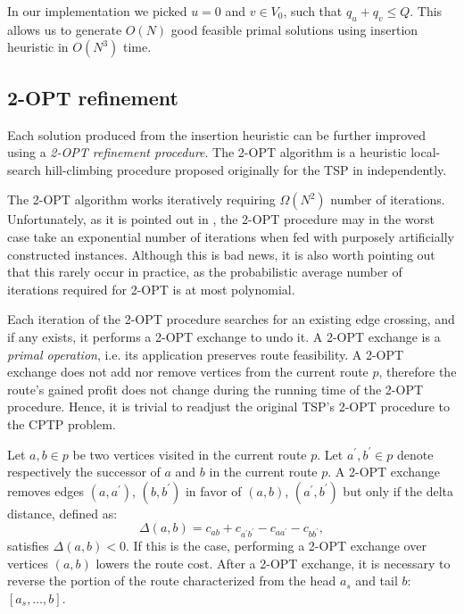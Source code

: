 In our implementation we picked $u = 0$ and $v \in V_0$, such that $q_u + q_v \le Q$.
This allows us to generate $O(N)$ good feasible primal solutions using insertion heuristic in $O(N^3)$ time.

\subsection{2-OPT refinement}
\label{sec:impl-2opt-refinement}

Each solution produced from the insertion heuristic
can be further improved using a \textit{2-OPT refinement procedure}.
The 2-OPT algorithm is a heuristic local-search hill-climbing procedure
proposed originally for the TSP in \textcite{flood1956, croes1958} independently.

The 2-OPT algorithm works iteratively requiring $\Omega(N^2)$ number of iterations.
Unfortunately,
as it is pointed out in \textcite{chandra1999},
the 2-OPT procedure may in the worst case take an exponential number of iterations
when fed with purposely artificially constructed instances.
Although this is bad news,
it is also worth pointing out that this rarely occur in practice,
as the probabilistic average number of iterations required for 2-OPT is at most polynomial.

Each iteration of the 2-OPT procedure searches for an existing edge crossing,
and if any exists,
it performs a 2-OPT exchange to undo it.
A 2-OPT exchange is a \textit{primal operation},
i.e. its application preserves route feasibility.
A 2-OPT exchange does not add nor remove vertices from the current route $p$,
therefore the route's gained profit does not change during
the running time of the 2-OPT procedure.
Hence, it is trivial to readjust the original TSP's 2-OPT procedure to the CPTP problem.

Let $a, b \in p$ be two vertices visited in the current route $p$.
Let $a^\prime, b^\prime \in p$ denote respectively the successor of $a$ and $b$ in the current route $p$.
A 2-OPT exchange removes edges $(a, a^\prime)$, $(b, b^\prime)$
in favor of $(a, b)$, $(a^\prime, b^\prime)$
but only if the delta distance, defined as:
\begin{equation}
	\Delta(a, b) = c_{a b} + c_{a^\prime b^\prime} - c_{a a^\prime} - c_{b b^\prime},
\end{equation}
satisfies $\Delta(a, b) < 0$.
If this is the case, performing a 2-OPT exchange over vertices $(a, b)$ lowers the route cost.
After a 2-OPT exchange,
it is necessary to reverse the portion of the route
characterized from the head $a_s$ and tail $b$: $[a_s, \dots, b]$.

